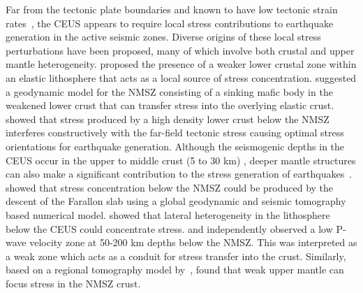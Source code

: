 \documentclass[draft,linenumbers]{agujournal2018}
\begin{document}
    Far from the tectonic plate boundaries and known to have low tectonic strain rates~\citep{Boyd_2015}, the CEUS appears to require local stress contributions to earthquake generation in the active seismic zones. Diverse origins of these local stress perturbations have been proposed, many of which involve both crustal and upper mantle heterogeneity. \citet{Kenner_2000a} proposed the presence of a weaker lower crustal zone within an elastic lithosphere that acts as a local source of stress concentration. \citet{Pollitz_2001} suggested a geodynamic model for the NMSZ consisting of a sinking mafic body in the weakened lower crust that can transfer stress into the overlying elastic crust. \citet{levandowski2016dense} showed that stress produced by a high density lower crust below the NMSZ interferes constructively with the far-field tectonic stress causing optimal stress orientations for earthquake generation.  Although the seismogenic depths in the CEUS occur in the upper to middle crust (5 to 30 km) \citep{vlahovic1998et1d, johnston1996seismic, mazzotti2010state}, deeper mantle structures can also make a significant contribution to the stress generation of  earthquakes~\citep[e.g.,][]{forte2007descent, li2007stress, chen2014crust, nyamwandha2016joint, zhan2016stress}. \citet{forte2007descent} showed that stress concentration below the NMSZ could be produced by the descent of the Farallon slab using a global geodynamic and seismic tomography based numerical model. \citet{li2007stress} showed that lateral heterogeneity in the lithosphere below the CEUS could concentrate stress. \citet{chen2014crust} and \citet{nyamwandha2016joint} independently observed a low P-wave velocity zone at 50-200 km depths below the NMSZ. This was interpreted as a weak zone which acts as a conduit for stress transfer into the crust. Similarly, based on a regional tomography model by~\citet{pollitz2014seismic}, \citet{zhan2016stress} found that weak upper mantle can focus stress in the NMSZ crust.
    


   
    
\end{document}
